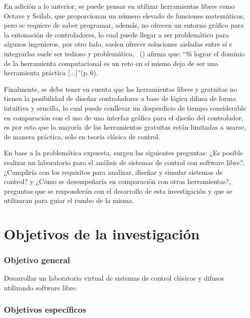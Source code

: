 	En adición a lo anterior, se puede pensar en utilizar herramientas libres como Octave y Scilab, que proporcionan un número elevado de funciones matemáticas, pero se requiere de saber programar, además, no ofrecen un entorno gráfico para la entonación de controladores, lo cual puede llegar a ser problemático para algunos ingenieros, por otro lado, suelen ofrecer soluciones aisladas entre sí e integrarlas suele ser tedioso y problemático, \citeauthor{Suarez}~(\citeyear{Suarez}) afirma que: \enquote{Si lograr el dominio de la herramienta computacional es un reto en sí mismo deja de ser una herramienta práctica [...]}(p.$\,$6).
	
	Finalmente, se debe tener en cuenta que las herramientas libres y gratuitas no tienen la posibilidad de diseñar controladores a base de lógica difusa de forma intuitiva y sencilla, lo cual puede conllevar un desperdicio de tiempo considerable en comparación con el uso de una interfaz gráfica para el diseño del controlador, es por esto que la mayoría de las herramientas gratuitas están limitadas a usarse, de manera práctica, solo en teoría clásica de control. 
	
	En base a la problemática expuesta, surgen las siguientes preguntas: ¿Es posible realizar un laboratorio para el análisis de sistemas de control con software libre?, ¿Cumpliría con los requisitos para analizar, diseñar y simular sistemas de control? y ¿Cómo se desempeñaría en comparación con otras herramientas?, preguntas que se responderán con el desarrollo de esta investigación y que se utilizaran para guiar el rumbo de la misma.
	
\section{Objetivos de la investigación}
	
	\subsubsection{Objetivo general}
		
		Desarrollar un laboratorio virtual de sistemas de control clásicos y difusos utilizando software libre.
		
	\subsubsection{Objetivos específicos}
		

